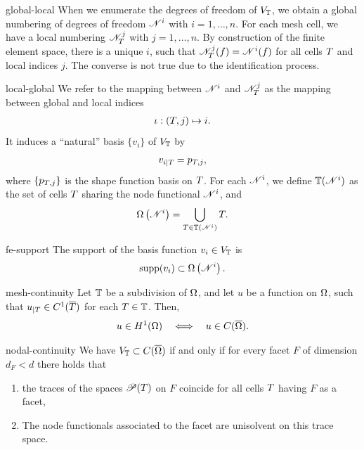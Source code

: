 \begin{Notation}{global-local}
  When we enumerate the degrees of freedom of $V_\mathbb T$, we obtain a
  global numbering of degrees of freedom $\mathscr N^i$ with
  $i=1,\dots,n$. For each mesh cell, we have a local numbering
  $\mathscr N_T^j$ with $j=1,\dots,n$. By construction of the finite
  element space, there is a unique $i$, such that
  $\mathscr N_T^j(f) = \mathscr N^i(f)$ for all cells $T$ and local
  indices $j$. The converse is not true due to the identification
  process.
\end{Notation}

\begin{Definition}{local-global}
  We refer to the mapping between $\mathscr N^i$ and $\mathscr N_T^j$ as
  the mapping between global and local indices
  \begin{gather}
    \iota: (T, j) \mapsto i.
  \end{gather}
  It induces a
  ``natural'' basis $\{v_i\}$ of $V_\mathbb T$ by
  \begin{gather}
    v_{i|T} = p_{T,j},
  \end{gather}
  where $\{p_{T,j}\}$ is the shape function basis on $T$. For
  each $\mathscr N^i$, we define $\mathbb T(\mathscr N^i)$ as the set of cells
  $T$ sharing the node functional $\mathscr N^i$, and
  \begin{gather}
    \Omega\left(\mathscr N^i\right) = \bigcup_{T\in \mathbb T(\mathscr N^i)} T.
  \end{gather}
\end{Definition}

\begin{Lemma}{fe-support}
  The support of the basis function $v_i\in V_\mathbb T$ is
  \begin{gather*}
    \operatorname{supp}(v_i) \subset \Omega\left(\mathscr N^i\right).
  \end{gather*}
\end{Lemma}

\begin{Lemma}{mesh-continuity}
  Let $\mathbb T$ be a subdivision of $\Omega$, and let $u$ be a function
  on $\Omega$, such that $u_{|T} \in C^1(\overline{T})$ for
  each $T\in\mathbb T$. Then,
  \begin{gather}
    u\in H^1(\Omega)
    \quad \Longleftrightarrow\quad
    u\in C(\overline{\Omega}).
  \end{gather}
\end{Lemma}

\begin{Lemma}{nodal-continuity}
  We have $V_\mathbb T\subset C(\overline{\Omega})$ if and only if for
  every facet $F$ of dimension $d_F < d$ there holds that
  \begin{enumerate}
  \item the traces of the spaces $\mathscr P(T)$ on $F$ coincide
    for all cells $T$ having $F$ as a facet,
  \item The node functionals associated to the facet are unisolvent on
    this trace space.
  \end{enumerate}
\end{Lemma}

